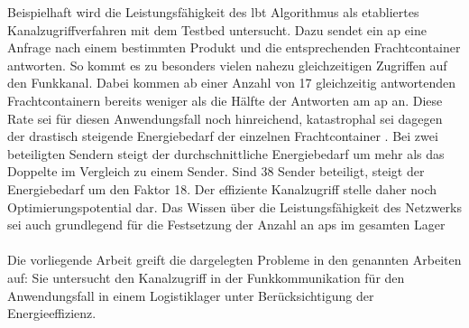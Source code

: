 Beispielhaft wird die Leistungsfähigkeit des \acl{lbt} Algorithmus als etabliertes Kanalzugriffverfahren mit dem Testbed untersucht. Dazu sendet ein \acs{ap} eine Anfrage nach einem bestimmten Produkt und die entsprechenden Frachtcontainer antworten. So kommt es zu besonders vielen nahezu gleichzeitigen Zugriffen auf den Funkkanal.
Dabei kommen ab einer Anzahl von 17 gleichzeitig antwortenden Frachtcontainern bereits weniger als die Hälfte der Antworten am \ac{ap} an. Diese Rate sei für diesen Anwendungsfall noch hinreichend, katastrophal sei dagegen der drastisch steigende Energiebedarf der einzelnen Frachtcontainer \cite{Falkenberg2017b}. Bei zwei beteiligten Sendern steigt der durchschnittliche Energiebedarf um mehr als das Doppelte im Vergleich zu einem Sender. Sind 38 Sender beteiligt, steigt der Energiebedarf um den Faktor 18. Der effiziente Kanalzugriff stelle daher noch Optimierungspotential dar. Das Wissen über die Leistungsfähigkeit des Netzwerks sei auch grundlegend für die Festsetzung der Anzahl an \acsp{ap} im gesamten Lager\\
\\
Die vorliegende Arbeit greift die dargelegten Probleme in den genannten Arbeiten auf: Sie untersucht den Kanalzugriff in der Funkkommunikation für den Anwendungsfall in einem Logistiklager unter Berücksichtigung der Energieeffizienz.








